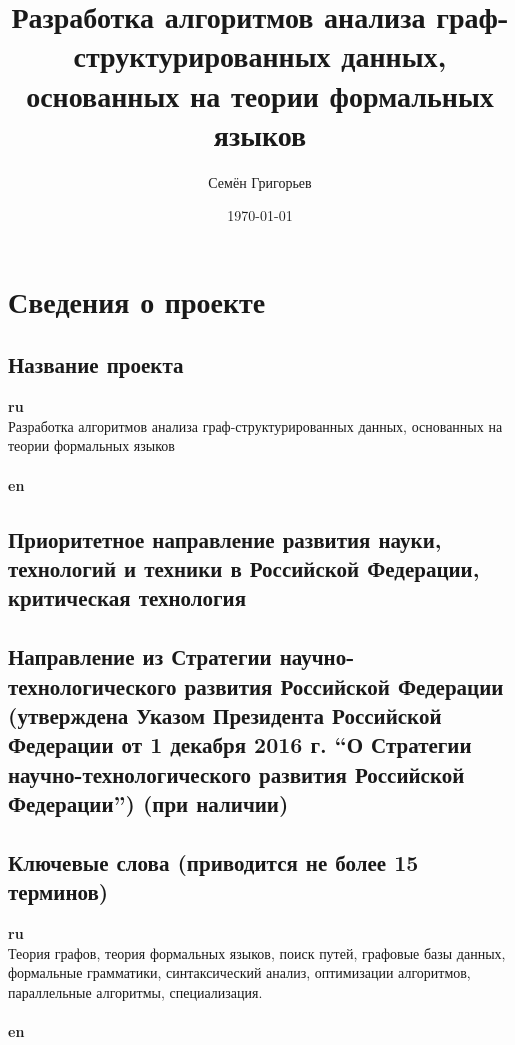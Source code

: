 \documentclass[12pt]{article}  %
\title{Разработка алгоритмов анализа граф-структурированных данных, основанных на теории формальных языков}
\author{Семён Григорьев}
\date{\today}
\theoremstyle{remark}
\begin{document}

\maketitle

\section{Сведения о проекте}

\subsection{Название проекта}

\textbf{ru}\\
%
Разработка алгоритмов анализа граф-структурированных данных, основанных на теории формальных языков
\\
\\
\textbf{en}\\


\subsection{Приоритетное направление развития науки, технологий и техники в Российской Федерации, критическая технология}
%


\subsection{Направление из Стратегии научно-технологического развития Российской Федерации (утверждена Указом Президента Российской Федерации от 1 декабря 2016 г.  ``О Стратегии научно-технологического развития Российской Федерации'') (при наличии)}
%

\subsection{Ключевые слова (приводится не более 15 терминов)}

\textbf{ru}\\
%
Теория графов, теория формальных языков, поиск путей, графовые базы данных, формальные грамматики, синтаксический анализ, оптимизации алгоритмов, параллельные алгоритмы, специализация.
\\
\\
\textbf{en}\\
\end{document}
